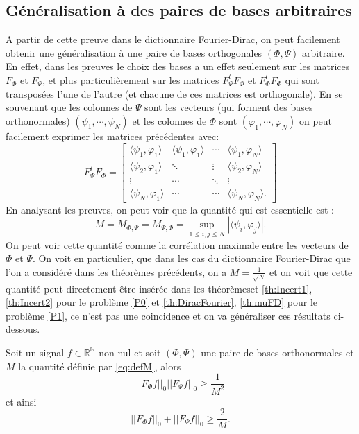 \subsection{Généralisation à des paires de bases arbitraires}
	A partir de cette preuve dans le dictionnaire Fourier-Dirac, on peut facilement obtenir une généralisation à une paire de bases orthogonales $(\Phi, \Psi)$ arbitraire.
	En effet, dans les preuves le choix des bases a un effet seulement sur les matrices $F_{\Phi}$ et $F_{\Psi}$, et plus particulièrement sur les matrices $F_{\Psi}^t F_{\Phi}$ et $F_{\Phi}^t F_{\Phi}$ qui sont transposées l'une de l'autre (et chacune de ces matrices est orthogonale).
	En se souvenant que les colonnes de $\Psi$ sont les vecteurs (qui forment des bases orthonormales) $(\psi_1, \cdots, \psi_N)$ et les colonnes de $\Phi$ sont $(\varphi_1,\cdots,\varphi_N)$ on peut facilement exprimer les matrices précédentes avec:
	\begin{equation}
		F_{\Psi}^tF_{\Phi} = \begin{bmatrix}
			\langle \psi_1, \varphi_1 \rangle & 	\langle \psi_1, \varphi_1 \rangle	&\cdots 	&	\langle \psi_1, \varphi_N \rangle\\
			\langle \psi_2, \varphi_1 \rangle & 	\ddots 					& \vdots 	&	\langle \psi_2, \varphi_N \rangle \\
			\vdots 				& \cdots 				&\ddots 	 	&	\vdots \\
			\langle \psi_N, \varphi_1 \rangle & \cdots 				& \cdots 		&	 \langle \psi_N, \varphi_N \rangle. 
		\end{bmatrix}
	\end{equation}
	En analysant les preuves, on peut voir que la quantité qui est essentielle est :
	\begin{equation}\label{eq:defM}
		M = M_{\Phi, \Psi} = M_{\Psi, \Phi} = \sup_{1\leq i,j\leq N} |\langle \psi_i, \varphi_j \rangle|.
	\end{equation}
	On peut voir cette quantité comme la corrélation maximale entre les vecteurs de $\Phi$ et $\Psi$.
	\newline
	On voit en particulier, que dans les cas du dictionnaire Fourier-Dirac que l'on a considéré dans les théorèmes précédents, on a $M=\frac{1}{\sqrt{N}}$ et on voit que cette quantité peut directement être insérée dans les théorèmeset \ref{th:Incert1}, \ref{th:Incert2} pour le problème \ref{P0} et \ref{th:DiracFourier}, \ref{th:muFD} pour le problème \ref{P1}, ce n'est pas une coincidence et on va généraliser ces résultats ci-dessous.
	\begin{theoreme}\label{th:IncertGen1}
		Soit un signal $f\in \mathbb{R^N}$ non nul et soit $(\Phi, \Psi)$ une paire de bases orthonormales et $M$ la quantité définie par \ref{eq:defM}, alors
		\begin{equation}
			||F_\Phi f||_0 ||F_\Psi f||_0 \geq \frac{1}{M^2} 	
		\end{equation}
		et ainsi
		\begin{equation}
			||F_\Phi f||_0 + ||F_\Psi f||_0 \geq \frac{2}{M}. 	
		\end{equation}
	\end{theoreme}
